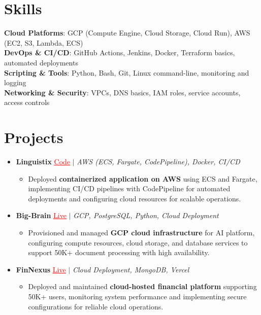 \documentclass[letterpaper,10pt]{article}
\newcommand{\resumeItem}[1]{\item\small{{#1 \vspace{-2pt}}}}
\newcommand{\resumeProjectHeading}[1]{\item \small #1 \vspace{-2pt}}
\newcommand{\resumeSubHeadingListStart}{\begin{itemize}[leftmargin=0.0in, label={}]}
\newcommand{\resumeSubHeadingListEnd}{\end{itemize}}
\newcommand{\resumeProjItemListStart}{\begin{itemize}[leftmargin=0.15in,label=\textbullet,itemsep=0pt,topsep=0pt,parsep=0pt,partopsep=0pt]}
\newcommand{\resumeProjItemListEnd}{\end{itemize}\vspace{-4pt}}
\begin{document}
\section{Skills}
\begin{itemize}[leftmargin=0.15in, label={}]
\small{\item{
\textbf{Cloud Platforms}: GCP (Compute Engine, Cloud Storage, Cloud Run), AWS (EC2, S3, Lambda, ECS) \\
\textbf{DevOps \& CI/CD}: GitHub Actions, Jenkins, Docker, Terraform basics, automated deployments \\
\textbf{Scripting \& Tools}: Python, Bash, Git, Linux command-line, monitoring and logging \\
\textbf{Networking \& Security}: VPCs, DNS basics, IAM roles, service accounts, access controls
}}
\end{itemize}
\vspace{-16pt}
\section{Projects}
\resumeSubHeadingListStart
\vspace{-2pt}
\resumeProjectHeading{\textbf{Linguistix} {\href{https://github.com/SAHAJ-BHADJA/Linguistix}{\textcolor{red}{\underline{Code}}}} $|$ \emph{AWS (ECS, Fargate, CodePipeline), Docker, CI/CD}}
\resumeProjItemListStart
\resumeItem{Deployed \textbf{containerized application on AWS} using ECS and Fargate, implementing CI/CD pipelines with CodePipeline for automated deployments and configuring cloud resources for scalable operations.}
\resumeProjItemListEnd
\vspace{3pt}
\resumeProjectHeading{\textbf{Big-Brain} {\href{https://big-brain-pied.vercel.app/}{\textcolor{red}{\underline{Live}}}} $|$ \emph{GCP, PostgreSQL, Python, Cloud Deployment}}
\resumeProjItemListStart
\resumeItem{Provisioned and managed \textbf{GCP cloud infrastructure} for AI platform, configuring compute resources, cloud storage, and database services to support 50K+ document processing with high availability.}
\resumeProjItemListEnd
\vspace{3pt}
\resumeProjectHeading{\textbf{FinNexus} {\href{https://fin-nexus.vercel.app/}{\textcolor{red}{\underline{Live}}}} $|$ \emph{Cloud Deployment, MongoDB, Vercel}}
\resumeProjItemListStart
\resumeItem{Deployed and maintained \textbf{cloud-hosted financial platform} supporting 50K+ users, monitoring system performance and implementing secure configurations for reliable cloud operations.}
\resumeProjItemListEnd
\resumeSubHeadingListEnd
\end{document}
